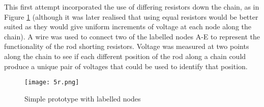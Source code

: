 This first attempt incorporated the use of differing resistors down the chain, as in Figure \ref{fig:5r} (although it was later realised that using equal resistors would be better suited as they would give uniform increments of voltage at each node along the chain). A wire was used to connect two of the labelled nodes A-E to represent the functionality of the rod shorting resistors. Voltage was measured at two points along the chain to see if each different position of the rod along a chain could produce a unique pair of voltages that could be used to identify that position.  \\



\begin{figure}[H]
	\begin{center}
	\texttt{[image: 5r.png]}\\ 
  	\caption{Simple prototype with labelled nodes}
    \label{fig:5r}
    \end{center}
\end{figure}



